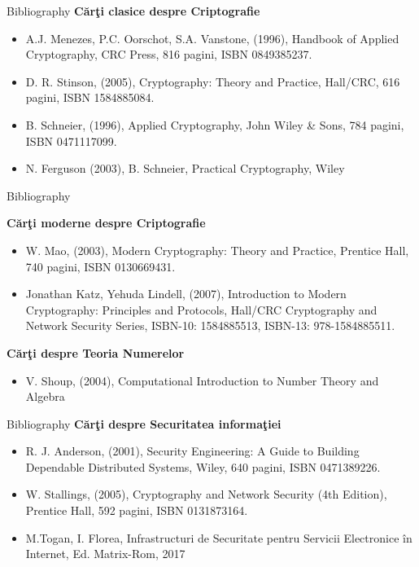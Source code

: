 \documentclass[pdf]{beamer}
\begin{document}
\begin{frame}{Bibliography}
\textbf{Cărţi clasice despre Criptografie}
\begin{itemize}
\item
A.J. Menezes, P.C. Oorschot, S.A. Vanstone, (1996), Handbook of Applied Cryptography, CRC Press, 816 pagini, ISBN 0849385237.
\item
D. R. Stinson, (2005), Cryptography: Theory and Practice, Hall/CRC, 616 pagini, ISBN 1584885084.
\item
B. Schneier, (1996), Applied Cryptography, John Wiley \& Sons, 784 pagini, ISBN 0471117099.
\item
N. Ferguson (2003), B. Schneier, Practical Cryptography, Wiley

\end{itemize}
\end{frame}



\begin{frame}{Bibliography}

\textbf{Cărţi moderne despre Criptografie}
\begin{itemize}
\item
W. Mao, (2003), Modern Cryptography: Theory and Practice, Prentice Hall, 740 pagini, ISBN 0130669431.
\item
Jonathan Katz, Yehuda Lindell, (2007), Introduction to Modern Cryptography: Principles and Protocols, Hall/CRC Cryptography and Network Security Series, ISBN-10: 1584885513, ISBN-13: 978-1584885511.
\end{itemize}

\textbf{Cărţi despre Teoria Numerelor}
\begin{itemize}
\item
V. Shoup, (2004), Computational Introduction to Number Theory and Algebra
\end{itemize}

\end{frame}



\begin{frame}{Bibliography}
\textbf{Cărţi despre Securitatea informaţiei}
\begin{itemize}
\item
R. J. Anderson, (2001), Security Engineering: A Guide to Building Dependable Distributed Systems, Wiley, 640 pagini, ISBN 0471389226.
\item
W. Stallings, (2005), Cryptography and Network Security (4th Edition), Prentice Hall, 592 pagini, ISBN 0131873164.
\item
M.Togan, I. Florea, Infrastructuri de Securitate pentru Servicii Electronice în Internet, Ed. Matrix-Rom, 2017
\end{itemize}
\end{frame}
\end{document}
